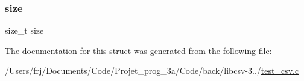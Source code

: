\hypertarget{structevent_a854352f53b148adc24983a58a1866d66}{}\label{structevent_a854352f53b148adc24983a58a1866d66} 
\subsubsection{\texorpdfstring{size}{size}}
{\footnotesize\ttfamily size\+\_\+t size}



The documentation for this struct was generated from the following file\+:\begin{DoxyCompactItemize}
\item 
/\+Users/frj/\+Documents/\+Code/\+Projet\+\_\+prog\+\_\+3a/\+Code/back/libcsv-\/3../\hyperlink{test__csv_8c}{test\+\_\+csv.\+c}\end{DoxyCompactItemize}

